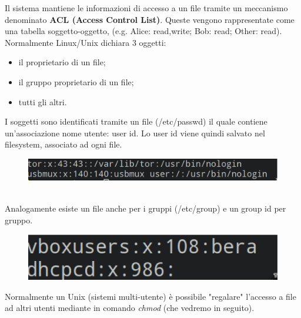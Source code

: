 Il sistema mantiene le informazioni di accesso a un file tramite un meccanismo denominato \textbf{ACL (Access Control List)}. Queste vengono rappresentate come una tabella soggetto-oggetto, (e.g. Alice: read,write; Bob: read; Other: read). Normalmente Linux/Unix dichiara 3 oggetti:
\begin{itemize}
    \item il proprietario di un file;
    \item il gruppo proprietario di un file;
    \item tutti gli altri.
\end{itemize}
\clearpage
I soggetti sono identificati tramite un file (/etc/passwd) il quale contiene un'associazione nome utente: user id. Lo user id viene quindi salvato nel filesystem, associato ad ogni file.
\begin{figure}[h!]
    \centering
    \includegraphics[width=.6\linewidth]{res/user_id.png}
    \caption{}
\end{figure}\\
Analogamente esiste un file anche per i gruppi (/etc/group) e un group id per gruppo.
\begin{figure}[h!]
    \centering
    \includegraphics[width=.4\linewidth]{res/group_id.png}
    \caption{}
\end{figure}
Normalmente un Unix (sistemi multi-utente) è possibile "regalare" l'accesso a file ad altri utenti mediante in comando \textit{chmod} (che vedremo in seguito).

